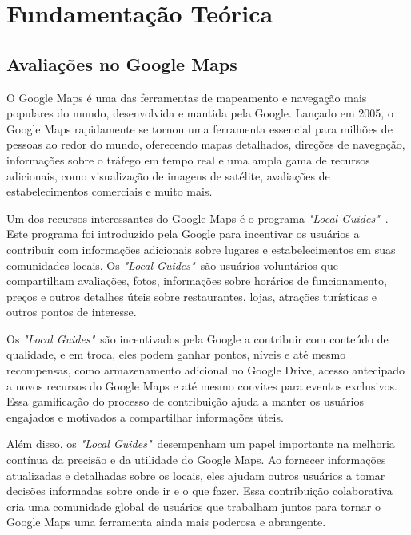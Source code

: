 \chapter{Fundamentação Teórica}
\label{cap:fund_teorica}



\section{Avaliações no Google Maps}
\label{cap:fund_teorica:sec:google_maps}

O Google Maps  é uma das ferramentas de mapeamento e navegação mais populares do mundo, desenvolvida e mantida pela Google. Lançado em 2005, o Google Maps rapidamente se tornou uma ferramenta essencial para milhões de pessoas ao redor do mundo, oferecendo mapas detalhados, direções de navegação, informações sobre o tráfego em tempo real e uma ampla gama de recursos adicionais, como visualização de imagens de satélite, avaliações de estabelecimentos comerciais e muito mais.

Um dos recursos interessantes do Google Maps é o programa \emph{"Local Guides"}~. Este programa foi introduzido pela Google para incentivar os usuários a contribuir com informações adicionais sobre lugares e estabelecimentos em suas comunidades locais. Os \emph{"Local Guides"}~são usuários voluntários que compartilham avaliações, fotos, informações sobre horários de funcionamento, preços e outros detalhes úteis sobre restaurantes, lojas, atrações turísticas e outros pontos de interesse.

Os \emph{"Local Guides"}~são incentivados pela Google a contribuir com conteúdo de qualidade, e em troca, eles podem ganhar pontos, níveis e até mesmo recompensas, como armazenamento adicional no Google Drive, acesso antecipado a novos recursos do Google Maps e até mesmo convites para eventos exclusivos. Essa gamificação do processo de contribuição ajuda a manter os usuários engajados e motivados a compartilhar informações úteis.

Além disso, os \emph{"Local Guides"}~desempenham um papel importante na melhoria contínua da precisão e da utilidade do Google Maps. Ao fornecer informações atualizadas e detalhadas sobre os locais, eles ajudam outros usuários a tomar decisões informadas sobre onde ir e o que fazer. Essa contribuição colaborativa cria uma comunidade global de usuários que trabalham juntos para tornar o Google Maps uma ferramenta ainda mais poderosa e abrangente.

